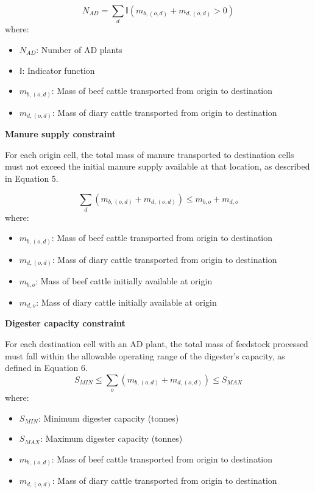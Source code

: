\documentclass[12pt]{article}
\begin{document}
\begin{equation}
  N_{AD} = \sum_d \mathbb{I}(m_{b, (o, d)} + m_{d, (o, d)} > 0)
\end{equation}
where:
\begin{itemize}
  \item $N_{AD}$: Number of AD plants
  \item $\mathbb{I}$: Indicator function
  \item $m_{b, (o, d)}$: Mass of beef cattle transported from origin to destination
  \item $m_{d, (o, d)}$: Mass of diary cattle transported from origin to destination
\end{itemize}

\vspace{10pt}
\textbf{Manure supply constraint}

For each origin cell, the total mass of manure transported to destination cells must not exceed the initial manure supply available at that location, as described in Equation 5.

\begin{equation}
  \sum_d (m_{b, (o, d)} + m_{d, (o, d)}) \leq m_{b,o} + m_{d,o}
\end{equation}
where:
\begin{itemize}
  \item $m_{b, (o, d)}$: Mass of beef cattle transported from origin to destination
  \item $m_{d, (o, d)}$: Mass of diary cattle transported from origin to destination
  \item $m_{b,o}$: Mass of beef cattle initially available at origin
  \item $m_{d,o}$: Mass of diary cattle initially available at origin
\end{itemize}

\vspace{10pt}
\textbf{Digester capacity constraint}

For each destination cell with an AD plant, the total mass of feedstock processed must fall within the allowable operating range of the digester’s capacity, as defined in Equation 6.
\begin{equation}
  S_{MIN} \leq \sum_o (m_{b, (o, d)} + m_{d, (o, d)}) \leq S_{MAX}
\end{equation}
where:
\begin{itemize}
  \item $S_{MIN}$: Minimum digester capacity (tonnes)
  \item $S_{MAX}$: Maximum digester capacity (tonnes)
  \item $m_{b, (o, d)}$: Mass of beef cattle transported from origin to destination
  \item $m_{d, (o, d)}$: Mass of diary cattle transported from origin to destination
\end{itemize}
\end{document}
